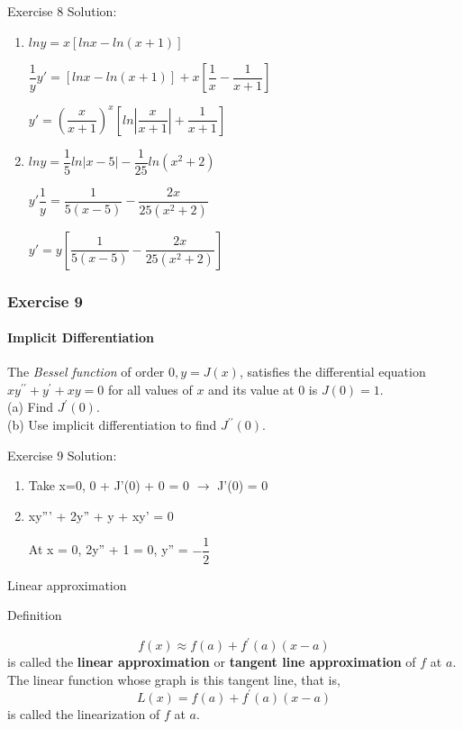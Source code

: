 \begin{frame}{Exercise 8}
    Solution:
    \begin{enumerate}
        \item $lny = x[lnx - ln(x+1)]$

              $\dfrac{1}{y}y' = [lnx - ln(x+1)] + x[\dfrac{1}{x} - \dfrac{1}{x+1}]$

              $y' = (\dfrac{x}{x+1})^x [ln|\dfrac{x}{x+1}| + \dfrac{1}{x+1}]$
        \item $lny = \dfrac{1}{5}ln|x-5| - \dfrac{1}{25}ln(x^2 + 2)$

              $y'\dfrac{1}{y} = \dfrac{1}{5(x-5)} - \dfrac{2x}{25(x^2+2)}$

              $y' = y[\dfrac{1}{5(x-5)} - \dfrac{2x}{25(x^2+2)}]$
    \end{enumerate}
\end{frame}




\begin{frame}
    \frametitle{Exercise 9}
    \framesubtitle{Implicit Differentiation}
    The \textit{Bessel function} of order $0, y=J(x)$, satisfies the differential equation $x y^{\prime \prime}+y^{\prime}+x y=0$ for all values of $x$ and its value at 0 is $J(0)=1$.\\
    (a) Find $J^{\prime}(0)$.\\
    (b) Use implicit differentiation to find $J^{\prime \prime}(0)$.
\end{frame}



\begin{frame}{Exercise 9}
    Solution:
    \begin{enumerate}
        \item Take x=0, 0 + J'(0) + 0 = 0 $\rightarrow$ J'(0) = 0
        \item xy''' + 2y'' + y + xy' = 0

              At x = 0, 2y'' + 1 = 0, y'' = $-\dfrac{1}{2}$
    \end{enumerate}

\end{frame}



\begin{frame}{Linear approximation}
    \begin{block}{Definition}

        $$
            f(x) \approx f(a)+f^{\prime}(a)(x-a)
        $$
        is called the \textbf{linear approximation} or \textbf{tangent line approximation} of $f$ at $a$. The linear function whose graph is this tangent line, that is,\\

        $$
            L(x)=f(a)+f^{\prime}(a)(x-a)
        $$
        is called the linearization of $f$ at $a$.
    \end{block}
\end{frame}


